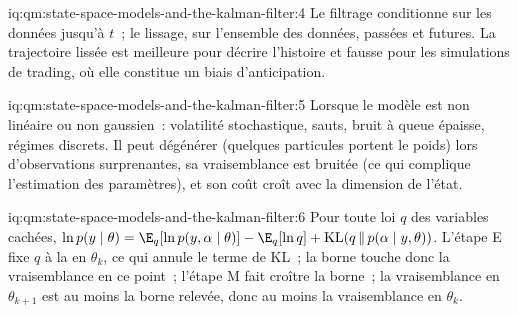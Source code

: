 \begin{solution}{iq:qm:state-space-models-and-the-kalman-filter:4}
Le filtrage conditionne sur les données jusqu'à $t$~; le lissage, sur l'ensemble des données, passées et futures. La trajectoire lissée est meilleure pour décrire l'histoire et fausse pour les simulations de trading,
où elle constitue un biais d'anticipation.
\end{solution}

\begin{solution}{iq:qm:state-space-models-and-the-kalman-filter:5}
Lorsque le modèle est non linéaire ou non gaussien~: volatilité stochastique, sauts, bruit à queue épaisse, régimes discrets. Il peut dégénérer (quelques particules portent le
poids) lors d'observations surprenantes, sa vraisemblance est bruitée (ce qui complique l'estimation des paramètres), et son coût croît avec la dimension de l'état.
\end{solution}

\begin{solution}{iq:qm:state-space-models-and-the-kalman-filter:6}
Pour toute loi $q$ des variables cachées, $\ln p(y \mid \theta) = \E_q[\ln p(y, \alpha \mid \theta)] - \E_q[\ln q] + \mathrm{KL}(q\,\|\,p(\alpha \mid y, \theta))$. L'étape E fixe $q$ à la
 en $\theta_k$, ce qui annule le terme de KL~; la borne touche donc la vraisemblance en ce point~; l'étape M fait croître la borne~; la vraisemblance en $\theta_{k+1}$ est au moins
la borne relevée, donc au moins la vraisemblance en $\theta_k$.
\end{solution}
